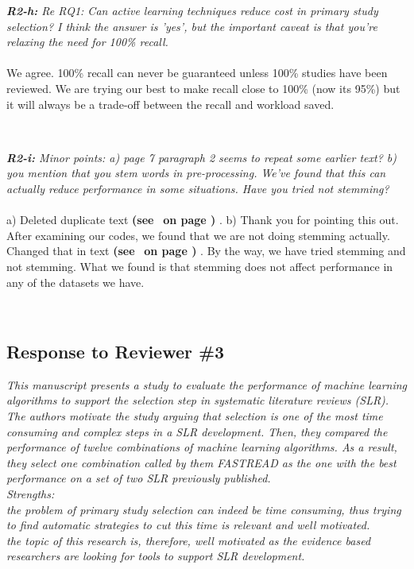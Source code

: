 \documentclass{svjour3}
\theoremstyle{break}
\newcommand{\review}[1]{{\textit{#1}}~\\}
\newcommand{\citeresp}[1]{
{\bf (see } \fcolorbox{black}{black!15}{
 \bf
  \scriptsize R-{#1}}~{\bf{on page \pageref{response:#1})}}
}
\begin{document}
\review{\textbf{R2-h:} Re RQ1: Can active learning techniques reduce cost in primary study selection? I think the answer is 'yes', but the important caveat is that you're relaxing the need for 100\% recall.}
\\
We agree. 100\% recall can never be guaranteed unless 100\% studies have been reviewed. We are trying our best to make recall close to 100\% (now its 95\%) but it will always be a trade-off between the recall and workload saved.
\par ~

\review{\textbf{R2-i:} Minor points:
a) page 7 paragraph 2 seems to repeat some earlier text?
b) you mention that you stem words in pre-processing. We've found that this can actually reduce performance in some situations. Have you tried not stemming?}
\\
a) Deleted duplicate text \citeresp{2i}. b) Thank you for pointing this out. After examining our codes, we found that we are not doing stemming actually. Changed that in text \citeresp{1g1}. By the way, we have tried stemming and not stemming. What we found is that stemming does not affect performance in any of the datasets we have. 
\par ~


\subsection*{Response to Reviewer \#3}

\review{This manuscript presents a study to evaluate the performance of machine learning algorithms to support the selection step in systematic literature reviews (SLR). The authors motivate the study arguing that selection is one of the most time consuming and complex steps in a SLR development. Then, they compared the performance of twelve combinations of machine learning algorithms. As a result, they select one combination called by them FASTREAD as the one with the best performance on a set of two SLR previously published.}

\review{Strengths:}

\review{the problem of primary study selection can indeed be time consuming, thus trying to find automatic strategies to cut this time is relevant and well motivated.}

\review{the topic of this research is, therefore, well motivated as the evidence based researchers are looking for tools to support SLR development.}
\end{document}
